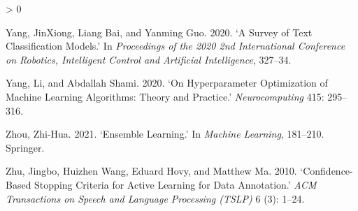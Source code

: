 \documentclass{article}
\newlength{\cslhangindent}
\newenvironment{CSLReferences}[2] %
 {%
  \setlength{\parindent}{0pt}
  \ifodd #1 \everypar{\setlength{\hangindent}{\cslhangindent}}\ignorespaces\fi
  \ifnum #2 > 0
  \setlength{\parskip}{#2\baselineskip}
  \fi
 }%
 {}
\begin{document}
\begin{CSLReferences}{1}{0}
\leavevmode\hypertarget{ref-yang2020survey}{}%
Yang, JinXiong, Liang Bai, and Yanming Guo. 2020. {`A Survey of Text
Classification Models.'} In \emph{Proceedings of the 2020 2nd
International Conference on Robotics, Intelligent Control and Artificial
Intelligence}, 327--34.

\leavevmode\hypertarget{ref-yang2020hyperparameter}{}%
Yang, Li, and Abdallah Shami. 2020. {`On Hyperparameter Optimization of
Machine Learning Algorithms: Theory and Practice.'}
\emph{Neurocomputing} 415: 295--316.

\leavevmode\hypertarget{ref-zhou2021ensemble}{}%
Zhou, Zhi-Hua. 2021. {`Ensemble Learning.'} In \emph{Machine Learning},
181--210. Springer.

\leavevmode\hypertarget{ref-zhu2010confidence}{}%
Zhu, Jingbo, Huizhen Wang, Eduard Hovy, and Matthew Ma. 2010.
{`Confidence-Based Stopping Criteria for Active Learning for Data
Annotation.'} \emph{ACM Transactions on Speech and Language Processing
(TSLP)} 6 (3): 1--24.

\end{CSLReferences}



\end{document}
